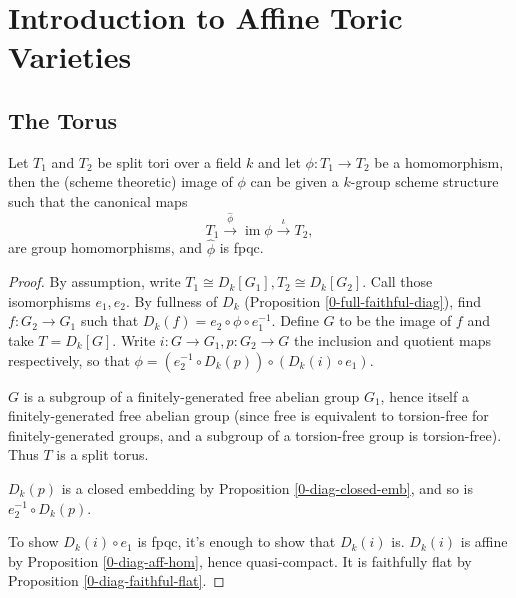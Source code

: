 \section{Introduction to Affine Toric Varieties}


\subsection{The Torus}


\begin{proposition}
  \label{1-1-1-group-hom-torus} %

  Let $T_1$ and $T_2$ be split tori over a field $k$ and let $\phi: T_1 \to T_2$ be a homomorphism,
  then the (scheme theoretic) image of $\phi$ can be given a $k$-group scheme structure such that
  the canonical maps
  \[
    T_1 \xrightarrow{\hat{\phi}} \operatorname{im}\phi \xrightarrow{\iota} T_2,
  \]
  are group homomorphisms, and $\hat{\phi}$ is fpqc.
\end{proposition}
\begin{proof}

  By assumption, write $T_1 \cong D_k[G_1], T_2 \cong D_k[G_2]$.
  Call those isomorphisms $e_1, e_2$.
  By fullness of $D_k$ (Proposition \ref{0-full-faithful-diag}),
  find $f : G_2 \to G_1$ such that $D_k(f) = e_2 \circ \phi \circ e_1^{-1}$.
  Define $G$ to be the image of $f$ and take $T = D_k[G]$.
  Write $i : G \to G_1, p : G_2 \to G$ the inclusion and quotient maps respectively,
  so that $\phi = (e_2^{-1} \circ D_k(p)) \circ (D_k(i) \circ e_1)$.

  $G$ is a subgroup of a finitely-generated free abelian group $G_1$,
  hence itself a finitely-generated free abelian group
  (since free is equivalent to torsion-free for finitely-generated groups,
  and a subgroup of a torsion-free group is torsion-free).
  Thus $T$ is a split torus.

  $D_k(p)$ is a closed embedding by Proposition \ref{0-diag-closed-emb},
  and so is $e_2^{-1} \circ D_k(p)$.

  To show $D_k(i) \circ e_1$ is fpqc, it's enough to show that $D_k(i)$ is.
  $D_k(i)$ is affine by Proposition \ref{0-diag-aff-hom}, hence quasi-compact.
  It is faithfully flat by Proposition \ref{0-diag-faithful-flat}.
\end{proof}



